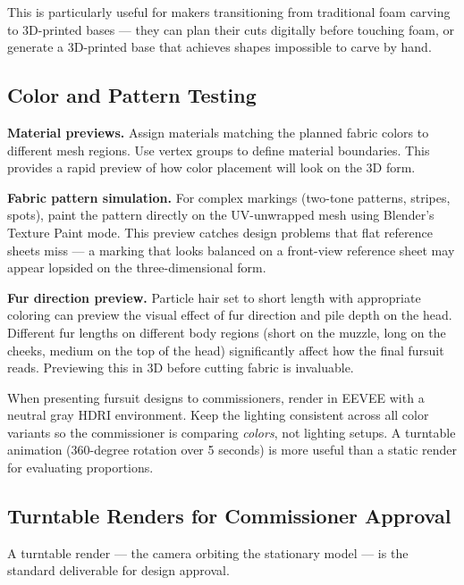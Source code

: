 This is particularly useful for makers transitioning from traditional foam carving to 3D-printed bases --- they can plan their cuts digitally before touching foam, or generate a 3D-printed base that achieves shapes impossible to carve by hand.


\subsection{Color and Pattern Testing}

\textbf{Material previews.} Assign materials matching the planned fabric colors to different mesh regions. Use vertex groups to define material boundaries. This provides a rapid preview of how color placement will look on the 3D form.

\textbf{Fabric pattern simulation.} For complex markings (two-tone patterns, stripes, spots), paint the pattern directly on the UV-unwrapped mesh using Blender's Texture Paint mode. This preview catches design problems that flat reference sheets miss --- a marking that looks balanced on a front-view reference sheet may appear lopsided on the three-dimensional form.

\textbf{Fur direction preview.} Particle hair set to short length with appropriate coloring can preview the visual effect of fur direction and pile depth on the head. Different fur lengths on different body regions (short on the muzzle, long on the cheeks, medium on the top of the head) significantly affect how the final fursuit reads. Previewing this in 3D before cutting fabric is invaluable.

\begin{tipbox}
When presenting fursuit designs to commissioners, render in EEVEE with a neutral gray HDRI environment. Keep the lighting consistent across all color variants so the commissioner is comparing \emph{colors}, not lighting setups. A turntable animation (360-degree rotation over 5 seconds) is more useful than a static render for evaluating proportions.
\end{tipbox}


\subsection{Turntable Renders for Commissioner Approval}

A turntable render --- the camera orbiting the stationary model --- is the standard deliverable for design approval.

